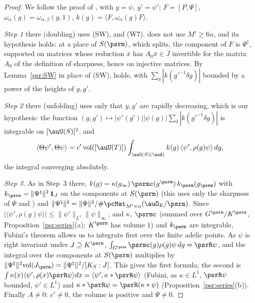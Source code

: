 \documentclass[10pt]{amsart}
\theoremstyle{definition}
\theoremstyle{remark}
\begin{document}
\begin{proof}
We follow the proof of {\cite[Proposition~2.16]{P53}}, with $y=\psi$, $y'=\psi'$; $F=[P,\Psi]$,
$\omega_\alpha(g)=\omega_{\alpha,\beta}(g,1)$, $k(g)=\langle F,\omega_\alpha(g)F\rangle$.

\emph{Step 1} there (doubling) uses (SW), {\cite[Lemma~2.14]{P53}} and (W7). {\cite[Lemma~2.14]{P53}} does not
use $M'\ge6n$, and its hypothesis holds: at a place of $S(\psrm)$, which splits, the component of $F$ is
$\Psi^\natural$, supported on matrices whose reduction $\bar x$ has $A_0\bar x\in\bar J$ invertible for
the matrix $A_0$ of the definition of sharpness, hence on injective matrices. By
Lemma~\ref{psr:SW} in place of (SW), {\cite[(7)]{P53}} holds, with
$\sum_\delta|k(g'^{-1}\delta g)|$ bounded by a power of the heights of $g,g'$.

\emph{Step 2} there (unfolding) uses only that $y,y'$ are rapidly decreasing, which is our hypothesis:
the function $(g,g')\mapsto|\psi'(g')||\psi(g)|\sum_\delta|k(g'^{-1}\delta g)|$ is integrable on
$[\auU(S)]^2$, and
\[
\langle\Theta\psi',\Theta\psi\rangle=c'\,\mathrm{vol}([\auU(T)])\int_{\auU(S)(\auA)}k(g)\,\langle\psi',
\rho(g)\psi\rangle\,dg ,
\]
the integral converging absolutely.

\emph{Step 3.} As in Step~3 there, $k(g)=\kappa(g_\infty)\,\psrmc(g^\psrm)\,k_\psrm(g_\psrm)$ with
$k_\psrm=\|\Psi^\natural\|^2\,\mathbf 1_J$ on the components at $S(\psrm)$ (this uses only the sharpness
of $\Psi$ and {\cite[Lemma~2.9]{P53}}) and $\|\Psi^\natural\|^2=\|\Psi\|^2/\#\pcMat_{M'\times n}(\auO_E/\psrm)$.
Since $|\langle\psi',\rho(g)\psi\rangle|\le\|\psi'\|_{L^1}\|\psi\|_\infty$, and $\kappa$, $\psrmc$ (summed
over $G^\psrm/K^\psrm$, Proposition~\ref{psr:series}(a); $K^\psrm$ has volume $1$) and $k_\psrm$ are
integrable, Fubini's theorem allows us to integrate first over the finite adelic points. As $\psi$
is right invariant under $J\supseteq K^\psrm$, $\int_{G^\psrm}\psrmc(g)\rho(g)\psi\,dg=\psrR\psi$, and the
integral over the components at $S(\psrm)$ multiplies by $\|\Psi^\natural\|^2\mathrm{vol}(J_\psrm)=
\|\Psi^\natural\|^2/[K_S:J]$. This gives the first formula; the second is
$\int\kappa(x)\langle\psi',\rho(x)\psrR\psi\rangle dx=\langle\psi',\kappa*\psrR\psi\rangle$ (Fubini, as
$\kappa\in L^1$, $\psrR\psi$ bounded, $\psi'\in L^1$) and $\kappa*\psrR\psi=\psrR(\kappa*\psi)$
(Proposition~\ref{psr:series}(b)). Finally $A\ne0$: $c'\ne0$, the volume is positive and $\Psi\ne0$.
\end{proof}
\end{document}
